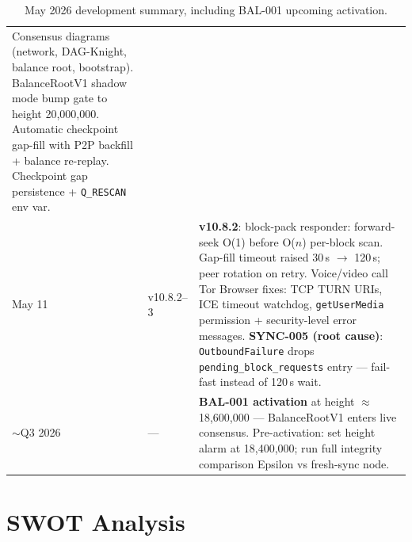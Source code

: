 \documentclass[12pt,a4paper]{article}
\begin{document}
\begin{table}[H]
\begin{tabularx}{\linewidth}{@{}l l X@{}}
  Consensus diagrams (network, DAG-Knight, balance root, bootstrap).
  BalanceRootV1 shadow mode bump gate to height 20,000,000.
  Automatic checkpoint gap-fill with P2P backfill + balance re-replay.
  Checkpoint gap persistence + \texttt{Q\_RESCAN} env var. \\
May 11 & v10.8.2--3 &
  \textbf{v10.8.2}: block-pack responder: forward-seek O(1) before O($n$) per-block scan.
    Gap-fill timeout raised 30\,s $\to$ 120\,s; peer rotation on retry.
  Voice/video call Tor Browser fixes: TCP TURN URIs, ICE timeout watchdog,
    \texttt{getUserMedia} permission + security-level error messages.
  \textbf{SYNC-005 (root cause)}: \texttt{OutboundFailure} drops \texttt{pending\_block\_requests}
    entry — fail-fast instead of 120\,s wait. \\
\midrule
\rowcolor{swotT}
$\sim$Q3 2026 & --- &
  \textbf{BAL-001 activation} at height $\approx$18,600,000 —
  BalanceRootV1 enters live consensus.
  Pre-activation: set height alarm at 18,400,000;
  run full integrity comparison Epsilon vs fresh-sync node. \\
\bottomrule
\end{tabularx}
\caption{May 2026 development summary, including BAL-001 upcoming activation.}
\end{table}

\section{SWOT Analysis}
\end{document}
